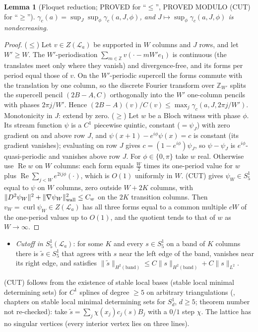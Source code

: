 \documentclass[11pt]{article}
\newtheorem{lemma}[theorem]{Lemma}
\theoremstyle{definition}
\theoremstyle{remark}
\newcommand{\norm}[1]{\|#1\|}
\begin{document}
\begin{lemma}[Floquet reduction; PROVED for ``$\le$'', PROVED MODULO (CUT) for ``$\ge$'']\label{lem:floq}
$\gamma_c(a)=\sup_J\sup_\phi\gamma_c(a,J,\phi)$, and $J\mapsto\sup_\phi\gamma_c(a,J,\phi)$ is nondecreasing.
\end{lemma}
\begin{proof}
($\le$) Let $v\in Z(\mathcal L_a)$ be supported in $W$ columns and $J$ rows, and let $W'\ge W$. The $W'$-periodisation $\sum_{m\in\mathbb Z}v(\cdot-mW'e_1)$ is continuous (the translates meet only where they vanish) and divergence-free, and its forms per period equal those of $v$. On the $W'$-periodic supercell the forms commute with the translation by one column, so the discrete Fourier transform over $\mathbb Z_{W'}$ splits the supercell pencil $(2B-A,C)$ orthogonally into the $W'$ one-column pencils with phases $2\pi j/W'$. Hence $(2B-A)(v)/C(v)\le\max_j\gamma_c(a,J,2\pi j/W')$. Monotonicity in $J$: extend by zero.
($\ge$) Let $w$ be a Bloch witness with phase $\phi$. Its stream function $\psi$ is a $C^1$ piecewise quintic, constant ($=\psi_J$) with zero gradient on and above row $J$, and $\psi(x+1)-e^{i\phi}\psi(x)=c$ is constant (its gradient vanishes); evaluating on row $J$ gives $c=(1-e^{i\phi})\psi_J$, so $\psi-\psi_J$ is $e^{i\phi}$-quasi-periodic and vanishes above row $J$. For $\phi\in\{0,\pi\}$ take $w$ real. Otherwise use $\operatorname{Re}w$ on $W$ columns: each form equals $\frac W2$ times its one-period value for $w$ plus $\operatorname{Re}\sum_{j<W}e^{2ij\phi}(\cdot)$, which is $O(1)$ uniformly in $W$. (CUT) gives $\psi_W\in S^1_5$ equal to $\psi$ on $W$ columns, zero outside $W+2K$ columns, with $\norm{D^2\psi_W}^2+\norm{\nabla\psi_W}^2_{\rm wall}\le C_w$ on the $2K$ transition columns. Then $v_W=\operatorname{curl}\psi_W\in Z(\mathcal L_a)$ has all three forms equal to a common multiple $cW$ of the one-period values up to $O(1)$, and the quotient tends to that of $w$ as $W\to\infty$.
\end{proof}
\begin{itemize}
\item[(CUT)] \emph{Cutoff in $S^1_5(\mathcal L_a)$}: for some $K$ and every $s\in S^1_5$ on a band of $K$ columns there is $\tilde s\in S^1_5$ that agrees with $s$ near the left edge of the band, vanishes near its right edge, and satisfies $\norm{\tilde s}_{H^2(\text{band})}\le C\norm s_{H^2(\text{band})}+C\norm s_{L^2}$.
\end{itemize}
(CUT) follows from the existence of stable local bases (stable local minimal determining sets) for $C^1$ splines of degree $\ge5$ on arbitrary triangulations (\cite{LaiSchumaker}, chapters on stable local minimal determining sets for $S^1_d$, $d\ge5$; theorem number not re-checked): take $\tilde s=\sum_j\chi(x_j)c_j(s)B_j$ with a $0/1$ step $\chi$. The lattice has no singular vertices (every interior vertex lies on three lines).
\end{document}
